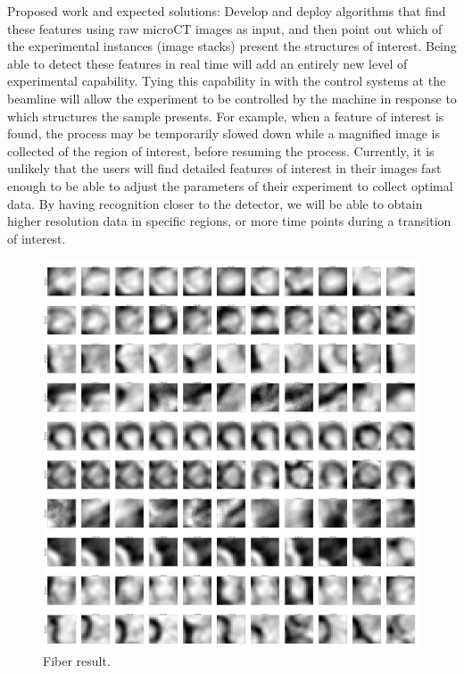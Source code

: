 Proposed work and expected solutions: Develop and deploy algorithms that find these features using raw microCT images as input, and then point out which of the experimental instances (image stacks) present the structures of interest. Being able to detect these features in real time will add an entirely new level of experimental capability. Tying this capability in with the control systems at the beamline will allow the experiment to be controlled by the machine in response to which structures the sample presents. For example, when a feature of interest is found, the process may be temporarily slowed down while a magnified image is collected of the region of interest, before resuming the process. Currently, it is unlikely that the users will find detailed features of interest in their images fast enough to be able to adjust the parameters of their experiment to collect optimal data. By having recognition closer to the detector, we will be able to obtain higher resolution data in specific regions, or more time points during a transition of interest.


\cite{IEEEBigData:2014}


\begin{figure}[h]
\centering
\includegraphics[width=\linewidth]{img/fiberResult.png}
\caption{Fiber result.}
\label{fig:fiberResult}
\end{figure}
